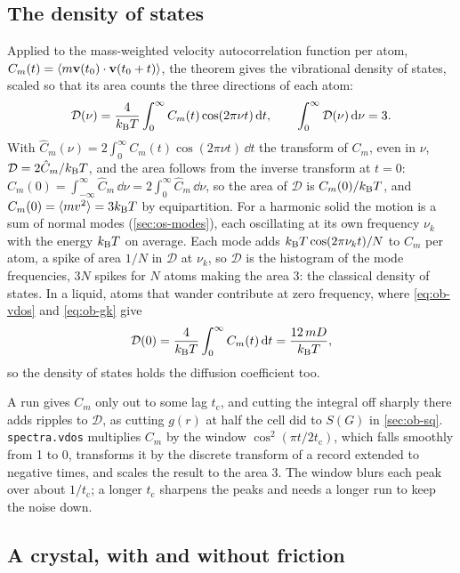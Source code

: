 \subsection*{The density of states}

Applied to the mass-weighted velocity autocorrelation function per atom,
$C_m(t) = \langle m\bm{\mathrm{v}}(t_0)\cdot\bm{\mathrm{v}}(t_0 + t) \rangle$, the theorem gives the
vibrational density of states, scaled so that its area counts the three
directions of each atom:
\begin{equation}
   \mathcal{D}(\nu) = \frac{4}{k_{\mathrm{B}} T}\int_0^\infty C_m(t)\cos(2\pi\nu t)\,
   \mathrm{d} t , \qquad \int_0^\infty\mathcal{D}(\nu)\,\mathrm{d}\nu = 3 .
   \label{eq:ob-vdos}
\end{equation}
With $\hat C_m(\nu) = 2\int_0^\infty C_m(t)\cos(2\pi\nu t)\,\dd t$ the
transform of $C_m$, even in $\nu$, $\mathcal{D} = 2\hat C_m/k_{\mathrm{B}} T$, and the
area follows from the inverse transform at $t = 0$: $C_m(0) =
\int_{-\infty}^\infty\hat C_m\,\dd\nu = 2\int_0^\infty\hat C_m\,\dd\nu$, so
the area of $\mathcal{D}$ is $C_m(0)/k_{\mathrm{B}} T$, and $C_m(0) = \langle mv^2 \rangle =
3k_{\mathrm{B}} T$ by equipartition. For a harmonic solid the motion is a sum of
normal modes (\cref{sec:os-modes}), each oscillating at its own
frequency $\nu_k$ with the energy $k_{\mathrm{B}} T$ on average. Each mode adds
$k_{\mathrm{B}} T\cos(2\pi\nu_kt)/N$ to $C_m$ per atom, a spike of area $1/N$ in
$\mathcal{D}$ at $\nu_k$, so $\mathcal{D}$ is the histogram of the mode
frequencies, $3N$ spikes for $N$ atoms making the area 3: the classical
density of states. In a liquid, atoms that wander contribute at zero
frequency, where \cref{eq:ob-vdos} and \cref{eq:ob-gk} give
\begin{equation*}
   \mathcal{D}(0) = \frac{4}{k_{\mathrm{B}} T}\int_0^\infty C_m(t)\,\mathrm{d} t =
   \frac{12\,mD}{k_{\mathrm{B}} T} ,
\end{equation*}
so the density of states holds the diffusion coefficient too.

A run gives $C_m$ only out to some lag $t_{\mathrm c}$, and cutting the
integral off sharply there adds ripples to $\mathcal{D}$, as cutting
$g(r)$ at half the cell did to $S(G)$ in \cref{sec:ob-sq}.
\texttt{spectra.vdos} multiplies $C_m$ by the window $\cos^2(\pi t/
2t_{\mathrm c})$, which falls smoothly from 1 to 0, transforms it by the
discrete transform of a record extended to negative times, and scales the
result to the area 3. The window blurs each peak over about
$1/t_{\mathrm c}$; a longer $t_{\mathrm c}$ sharpens the peaks and needs a
longer run to keep the noise down.

\subsection*{A crystal, with and without friction}

